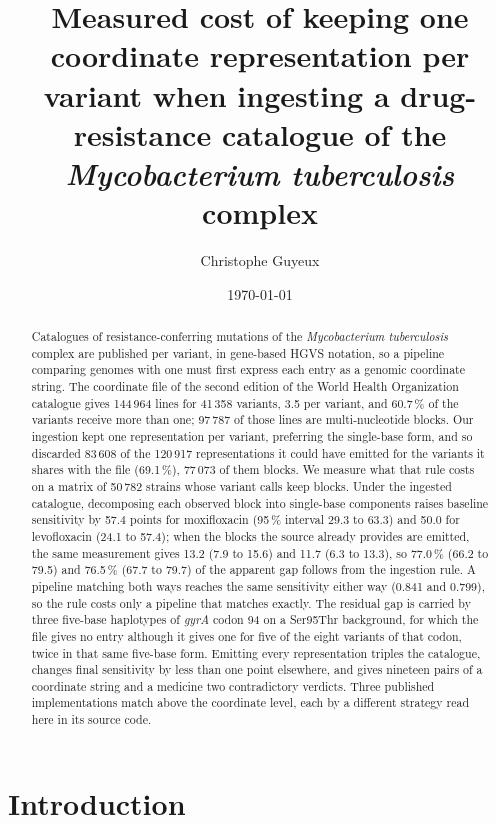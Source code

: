 \documentclass[11pt]{article}
\title{Measured cost of keeping one coordinate representation per variant when
ingesting a drug-resistance catalogue of the \textit{Mycobacterium tuberculosis}
complex}
\author[1]{Christophe Guyeux}
\affil[1]{Universit\'e Marie et Louis Pasteur, CNRS, institut FEMTO-ST, Besan\c{c}on, France}
\date{\today}
\begin{document}
\maketitle

\begin{abstract}
Catalogues of resistance-conferring mutations of the \textit{Mycobacterium tuberculosis}
complex are published per variant, in gene-based HGVS notation, so a pipeline comparing
genomes with one must first express each entry as a genomic coordinate string. The
coordinate file of the second edition of the World Health Organization catalogue gives
144\,964 lines for 41\,358 variants, 3.5 per variant, and 60.7\,\% of the variants receive
more than one; 97\,787 of those lines are multi-nucleotide blocks. Our ingestion kept one
representation per variant, preferring the single-base form, and so discarded 83\,608 of
the 120\,917 representations it could have emitted for the variants it shares with the file
(69.1\,\%), 77\,073 of them blocks. We measure what that rule costs on a matrix of 50\,782
strains whose variant calls keep blocks. Under the ingested catalogue, decomposing each
observed block into single-base components raises baseline sensitivity by 57.4 points for
moxifloxacin (95\,\% interval 29.3 to 63.3) and 50.0 for levofloxacin (24.1 to 57.4); when
the blocks the source already provides are emitted, the same measurement gives 13.2 (7.9 to
15.6) and 11.7 (6.3 to 13.3), so 77.0\,\% (66.2 to 79.5) and 76.5\,\% (67.7 to 79.7) of the
apparent gap follows from the ingestion rule. A pipeline matching both ways reaches the same
sensitivity either way (0.841 and 0.799), so the rule costs only a pipeline that matches
exactly. The residual gap is carried by three five-base haplotypes of \textit{gyrA} codon 94
on a Ser95Thr background, for which the file gives no entry although it gives one for five
of the eight variants of that codon, twice in that same five-base form. Emitting every representation triples the catalogue, changes final
sensitivity by less than one point elsewhere, and gives nineteen pairs of a coordinate
string and a medicine two contradictory verdicts. Three published implementations match
above the coordinate level, each by a different strategy read here in its source code.
\end{abstract}

\section{Introduction}
\end{document}
